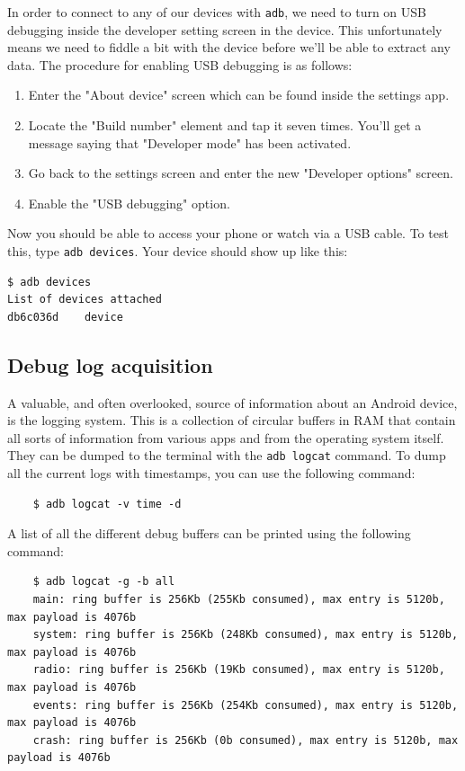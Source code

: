 \documentclass[a4paper,11pt,dvips]{article}
\begin{document}
In order to connect to any of our devices with \texttt{adb}, we need to turn on USB debugging inside the developer setting screen in the device. This unfortunately means we need to fiddle a bit with the device before we'll be able to extract any data. The procedure for enabling USB debugging is as follows:

\begin{enumerate}
\item Enter the "About device" screen which can be found inside the settings app.
\item Locate the "Build number" element and tap it seven times. You'll get a message saying that "Developer mode" has been activated.
\item Go back to the settings screen and enter the new "Developer options" screen.
\item Enable the "USB debugging" option.
\end{enumerate}

\noindent
Now you should be able to access your phone or watch via a USB cable. To test this, type \texttt{adb devices}. Your device should show up like this:

\scriptsize
\begin{verbatim}
$ adb devices
List of devices attached
db6c036d	device
\end{verbatim}
\normalsize


\subsection{Debug log acquisition}

A valuable, and often overlooked, source of information about an Android device, is the logging system. This is a collection of circular buffers in RAM that contain all sorts of information from various apps and from the operating system itself. They can be dumped to the terminal with the \texttt{adb logcat} command. To dump all the current logs with timestamps, you can use the following command:

\scriptsize
\begin{verbatim}
    $ adb logcat -v time -d
\end{verbatim}
\normalsize

\noindent
A list of all the different debug buffers can be printed using the following command:

\scriptsize
\begin{verbatim}
    $ adb logcat -g -b all
    main: ring buffer is 256Kb (255Kb consumed), max entry is 5120b, max payload is 4076b
    system: ring buffer is 256Kb (248Kb consumed), max entry is 5120b, max payload is 4076b
    radio: ring buffer is 256Kb (19Kb consumed), max entry is 5120b, max payload is 4076b
    events: ring buffer is 256Kb (254Kb consumed), max entry is 5120b, max payload is 4076b
    crash: ring buffer is 256Kb (0b consumed), max entry is 5120b, max payload is 4076b
\end{verbatim}
\normalsize
\end{document}
